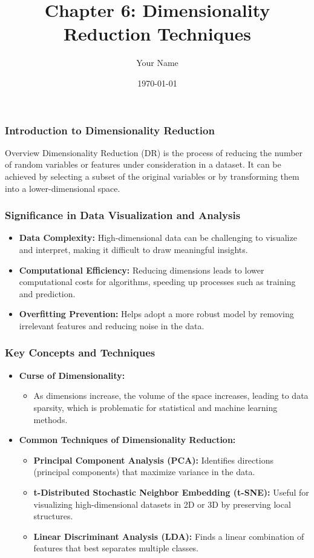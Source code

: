 \documentclass{beamer}
\title{Chapter 6: Dimensionality Reduction Techniques}
\author{Your Name}
\institute{Your Institution}
\date{\today}
\begin{document}
\frame{\titlepage}

\begin{frame}[fragile]
    \frametitle{Introduction to Dimensionality Reduction}
    \begin{block}{Overview}
        Dimensionality Reduction (DR) is the process of reducing the number of random variables or features under consideration in a dataset. It can be achieved by selecting a subset of the original variables or by transforming them into a lower-dimensional space.
    \end{block}
\end{frame}

\begin{frame}[fragile]
    \frametitle{Significance in Data Visualization and Analysis}
    \begin{itemize}
        \item \textbf{Data Complexity:} High-dimensional data can be challenging to visualize and interpret, making it difficult to draw meaningful insights.
        \item \textbf{Computational Efficiency:} Reducing dimensions leads to lower computational costs for algorithms, speeding up processes such as training and prediction.
        \item \textbf{Overfitting Prevention:} Helps adopt a more robust model by removing irrelevant features and reducing noise in the data.
    \end{itemize}
\end{frame}

\begin{frame}[fragile]
    \frametitle{Key Concepts and Techniques}
    \begin{itemize}
        \item \textbf{Curse of Dimensionality:} 
        \begin{itemize}
            \item As dimensions increase, the volume of the space increases, leading to data sparsity, which is problematic for statistical and machine learning methods.
        \end{itemize}
        
        \item \textbf{Common Techniques of Dimensionality Reduction:}
        \begin{itemize}
            \item \textbf{Principal Component Analysis (PCA):} Identifies directions (principal components) that maximize variance in the data.
            \item \textbf{t-Distributed Stochastic Neighbor Embedding (t-SNE):} Useful for visualizing high-dimensional datasets in 2D or 3D by preserving local structures.
            \item \textbf{Linear Discriminant Analysis (LDA):} Finds a linear combination of features that best separates multiple classes.
        \end{itemize}
    \end{itemize}
\end{frame}
\end{document}
